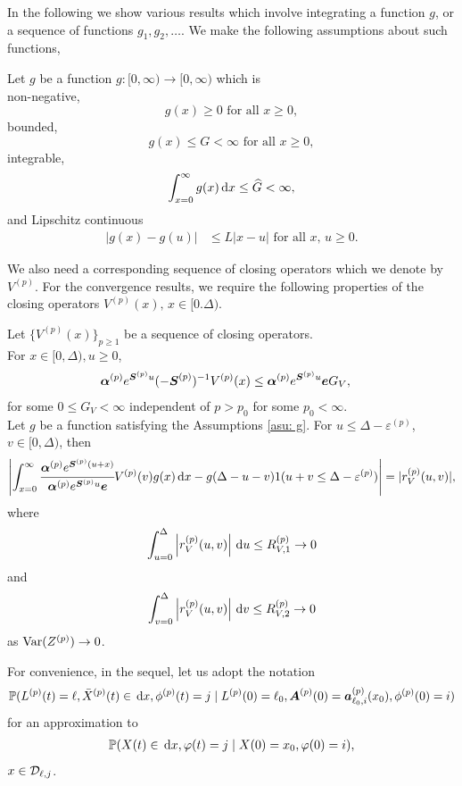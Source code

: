 In the following we show various results which involve integrating a function \(g\), or a sequence of functions \(g_1,g_2,\dots\). We make the following assumptions about such functions, 
\begin{asu}\label{asu: g}
	Let \(g\) be a function \(g:[0,\infty)\to [0,\infty)\) which is \\
	\subasu \label{asu: g non-neg} non-negative, 
	\[g(x) \geq 0 \mbox{ for all } x \geq 0,\]
	\subasu bounded, 
	\[g(x) \leq G < \infty \mbox{ for all } x \geq 0,\]
	\subasu integrable, 
	\[\int_{x=0}^\infty g(x)\, \mathrm{d} x \leq \widehat G < \infty,\]
	\subasu \label{asu: lipschitz} and Lipschitz continuous 
	\begin{align}
		|g(x) - g(u)|&\leq L|x - u| \mbox{ for all } x,\, u \geq 0.
	\end{align}
\end{asu}

We also need a corresponding sequence of closing operators which we denote by \(V^{(p)}\). For the convergence results, we require the following properties of the closing operators \(V^{(p)}(x),\, x \in[0.\Delta)\).
\begin{property}\label{properties: some props}
	Let \(\{V^{(p)}(x)\}_{p\geq 1}\) be a sequence of closing operators. \\
	\subproperty \label{properties: 1} For \(x\in[0,\Delta),u\geq 0\),  
        \begin{align*}
        		\boldsymbol \alpha^{(p)} e^{\boldsymbol S^{(p)}u}(-\boldsymbol S^{(p)})^{-1} V^{(p)}(x) &\leq \boldsymbol \alpha^{(p)} e^{\boldsymbol S^{(p)}u} \boldsymbol e G_V,
	\end{align*}
	for some \(0\leq G_V<\infty\) independent of \(p>p_0\) for some \(p_0<\infty\). \\
	\subproperty \label{properties: 2} Let \(g\) be a function satisfying the Assumptions \ref{asu: g}. For \(u\leq \Delta-\varepsilon^{(p)}\), \(v\in[0,\Delta)\), then
	\[\left|\int_{x=0}^\infty \cfrac{\boldsymbol \alpha^{(p)} e^{\boldsymbol{S}^{(p)}(u+x)} }{\boldsymbol \alpha^{(p)} e^{\boldsymbol{S}^{(p)}u} \boldsymbol e} V^{(p)}(v)g(x)\, \mathrm{d} x -g(\Delta-u-v) 1(u+v\leq\Delta-\varepsilon^{(p)})\right| =  |r_V^{(p)}(u,v)|,\]
	where 
	\[ \int_{u=0}^{\Delta}\left| r_V^{(p)}(u,v)\right| \, \mathrm{d} u  \leq R_{V,1}^{(p)} \to 0\]
	and 
	\[ \int_{v=0}^{\Delta}\left| r_V^{(p)}(u,v)\right| \, \mathrm{d} v  \leq R_{V,2}^{(p)} \to 0\]
	as \(\mathrm{Var}(Z^{(p)})\to 0\). 
\end{property}

For convenience, in the sequel, let us adopt the notation 
\begin{align}
	\mathbb P(L^{(p)}(t) = \ell, \bar X^{(p)}(t)\in\, \mathrm{d} x, \phi^{(p)}(t) = j\mid L^{(p)}(0)=\ell_0, \boldsymbol A^{(p)}(0) = \boldsymbol  a_{\ell_0,i}^{(p)}(x_0), \phi^{(p)}(0) = i) 
\end{align}
for an approximation to 
\begin{align}
	\mathbb P(X(t)\in\, \mathrm{d} x, \varphi(t) = j\mid X(0)=x_0, \varphi(0) = i),
\end{align}
\(x\in \mathcal{D}_{\ell,j}\).

